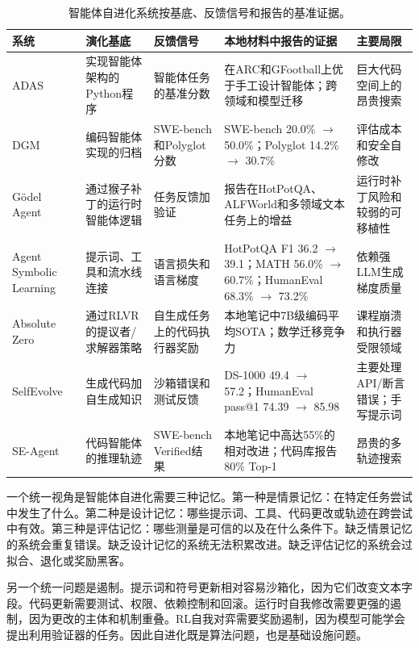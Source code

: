 \begin{table}[t]
\centering
\caption{智能体自进化系统按基底、反馈信号和报告的基准证据。}
\label{tab:agent-self-evolution-systems}
{\TableTight
\begin{tabularx}{\textwidth}{@{}L{0.13\textwidth}L{0.18\textwidth}L{0.19\textwidth}L{0.27\textwidth}Y@{}}
\toprule
\textbf{系统} & \textbf{演化基底} & \textbf{反馈信号} & \textbf{本地材料中报告的证据} & \textbf{主要局限} \\
\midrule
ADAS & 实现智能体架构的Python程序 & 智能体任务的基准分数 & 在ARC和GFootball上优于手工设计智能体；跨领域和模型迁移 & 巨大代码空间上的昂贵搜索 \\
DGM & 编码智能体实现的归档 & SWE-bench和Polyglot分数 & SWE-bench 20.0\% $\rightarrow$ 50.0\%；Polyglot 14.2\% $\rightarrow$ 30.7\% & 评估成本和安全自修改 \\
G{\"o}del Agent & 通过猴子补丁的运行时智能体逻辑 & 任务反馈加验证 & 报告在HotPotQA、ALFWorld和多领域文本任务上的增益 & 运行时补丁风险和较弱的可移植性 \\
Agent Symbolic Learning & 提示词、工具和流水线连接 & 语言损失和语言梯度 & HotPotQA F1 36.2 $\rightarrow$ 39.1；MATH 56.0\% $\rightarrow$ 60.7\%；HumanEval 68.3\% $\rightarrow$ 73.2\% & 依赖强LLM生成梯度质量 \\
Absolute Zero & 通过RLVR的提议者/求解器策略 & 自生成任务上的代码执行器奖励 & 本地笔记中7B级编码平均SOTA；数学迁移竞争力 & 课程崩溃和执行器受限领域 \\
SelfEvolve & 生成代码加自生成知识 & 沙箱错误和测试反馈 & DS-1000 49.4 $\rightarrow$ 57.2；HumanEval pass@1 74.39 $\rightarrow$ 85.98 & 主要处理API/断言错误；手写提示词 \\
SE-Agent & 代码智能体的推理轨迹 & SWE-bench Verified结果 & 本地笔记中高达55\%的相对改进；代码库报告80\% Top-1 & 昂贵的多轨迹搜索 \\
\bottomrule
\end{tabularx}}
\end{table}

一个统一视角是智能体自进化需要三种记忆。第一种是情景记忆：在特定任务尝试中发生了什么。第二种是设计记忆：哪些提示词、工具、代码更改或轨迹在跨尝试中有效。第三种是评估记忆：哪些测量是可信的以及在什么条件下。缺乏情景记忆的系统会重复错误。缺乏设计记忆的系统无法积累改进。缺乏评估记忆的系统会过拟合、退化或奖励黑客。

另一个统一问题是遏制。提示词和符号更新相对容易沙箱化，因为它们改变文本字段。代码更新需要测试、权限、依赖控制和回滚。运行时自我修改需要更强的遏制，因为更改的主体和机制重叠。RL自我对弈需要奖励遏制，因为模型可能学会提出利用验证器的任务。因此自进化既是算法问题，也是基础设施问题。

